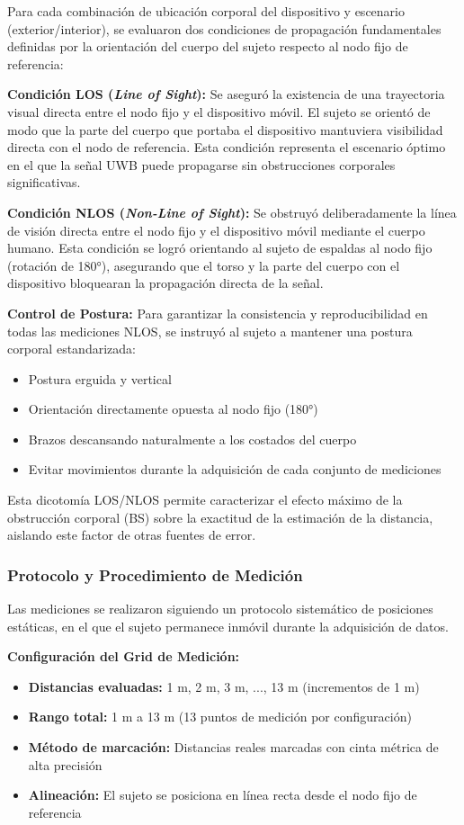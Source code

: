 Para cada combinación de ubicación corporal del dispositivo y escenario (exterior/interior), se evaluaron dos condiciones de propagación fundamentales definidas por la orientación del cuerpo del sujeto respecto al nodo fijo de referencia:

\textbf{Condición LOS (\textit{Line of Sight}):} Se aseguró la existencia de una trayectoria visual directa entre el nodo fijo y el dispositivo móvil. El sujeto se orientó de modo que la parte del cuerpo que portaba el dispositivo mantuviera visibilidad directa con el nodo de referencia. Esta condición representa el escenario óptimo en el que la señal UWB puede propagarse sin obstrucciones corporales significativas.

\textbf{Condición NLOS (\textit{Non-Line of Sight}):} Se obstruyó deliberadamente la línea de visión directa entre el nodo fijo y el dispositivo móvil mediante el cuerpo humano. Esta condición se logró orientando al sujeto de espaldas al nodo fijo (rotación de 180°), asegurando que el torso y la parte del cuerpo con el dispositivo bloquearan la propagación directa de la señal.

\textbf{Control de Postura:} Para garantizar la consistencia y reproducibilidad en todas las mediciones NLOS, se instruyó al sujeto a mantener una postura corporal estandarizada:
\begin{itemize}
\item Postura erguida y vertical
\item Orientación directamente opuesta al nodo fijo (180°)
\item Brazos descansando naturalmente a los costados del cuerpo
\item Evitar movimientos durante la adquisición de cada conjunto de mediciones
\end{itemize}

Esta dicotomía LOS/NLOS permite caracterizar el efecto máximo de la obstrucción corporal (BS) sobre la exactitud de la estimación de la distancia, aislando este factor de otras fuentes de error.

\subsubsection{Protocolo y Procedimiento de Medición}

Las mediciones se realizaron siguiendo un protocolo sistemático de posiciones estáticas, en el que el sujeto permanece inmóvil durante la adquisición de datos.

\textbf{Configuración del Grid de Medición:}
\begin{itemize}
\item \textbf{Distancias evaluadas:} 1 m, 2 m, 3 m, ..., 13 m (incrementos de 1 m)
\item \textbf{Rango total:} 1 m a 13 m (13 puntos de medición por configuración)
\item \textbf{Método de marcación:} Distancias reales marcadas con cinta métrica de alta precisión
\item \textbf{Alineación:} El sujeto se posiciona en línea recta desde el nodo fijo de referencia
\end{itemize}

